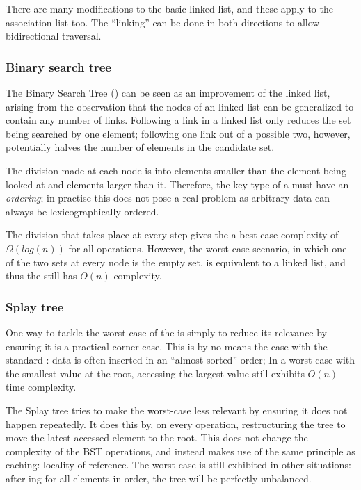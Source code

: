 There are many modifications to the basic linked list,
  and these apply to the association list too.
The \enquote{linking} can be done in both directions
  to allow bidirectional traversal.


\subsubsection{Binary search tree}

The Binary Search Tree (\BST) can be seen as an improvement of the linked list,
  arising from the observation that the nodes of an linked list
  can be generalized to contain any number of links.
Following a link in a linked list
  only reduces the set being searched by one element;
  following one link out of a possible two, however,
    potentially halves the number of elements in the candidate set.

The division made at each node is into
  elements smaller than the element being looked at
  and elements larger than it.
Therefore, the key type of a \BST
  must have an \emph{ordering};
  in practise this does not pose a real problem
    as arbitrary data can always be lexicographically ordered.

The division that takes place at every step
  gives the \BST a best-case complexity
  of $Ω(log(n))$ for all operations.\footnotemark  
However, the worst-case scenario,
  in which one of the two sets at every node is the empty set,
  is equivalent to a linked list,
  and thus the \BST still has $O(n)$ complexity.



\subsubsection{Splay tree}

One way to tackle the worst-case of the \BST
  is simply to reduce its relevance
  by ensuring it is a practical corner-case.
This is by no means the case with the standard \BST:
  data is often inserted in an \enquote{almost-sorted} order;
  In a worst-case \BST with the smallest value at the root,
    accessing the largest value still exhibits $O(n)$ time complexity.

The Splay tree tries to make the worst-case less relevant
  by ensuring it does not happen repeatedly.
It does this by, on every operation,
  restructuring the tree to move the latest-accessed element to the root.
This does not change the complexity of the BST operations,\footnotemark
  and instead makes use of the same principle as caching: locality of reference.
The worst-case is still exhibited in other situations:
  after ing for all elements in order,
  the tree will be perfectly unbalanced.


